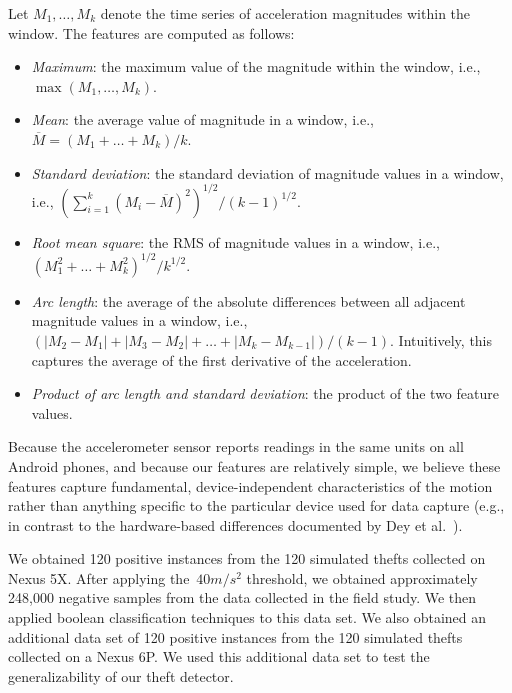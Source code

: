 Let $M_1,\dots,M_k$ denote the time series of acceleration magnitudes within the window.
The features are computed as follows:
\begin{itemize}
\item \emph{Maximum}: the maximum value of the magnitude within the window, i.e., $\max(M_1,\dots,M_k)$.
\item \emph{Mean}: the average value of magnitude in a window, i.e., $\overline{M}=(M_1+\dots + M_k)/k$.
\item \emph{Standard deviation}: the standard deviation of magnitude values in a window, i.e., $(\sum_{i=1}^{k}(M_i-\overline{M})^2)^{1/2}/(k-1)^{1/2}$.
\item \emph{Root mean square}: the RMS of magnitude values in a window, i.e., $(M_1^2 + \dots + M_k^2)^{1/2}/k^{1/2}$.
\item \emph{Arc length}: the average of the absolute differences between all adjacent magnitude values in a window, i.e., $(|M_2-M_1| + |M_3-M_2| + \dots + |M_k-M_{k-1}|)/(k-1)$.
Intuitively, this captures the average of the first derivative of the acceleration.
\item \emph{Product of arc length and standard deviation}: the product of the two feature values.
\end{itemize}

Because the accelerometer sensor reports readings in the same units on all Android phones, and because our features are relatively simple, we believe these features capture fundamental, device-independent characteristics of the motion rather than anything specific to the particular device used for data capture (e.g., in contrast to the hardware-based differences documented by Dey et al.~\cite{Dey2014}).

We obtained 120 positive instances from the 120 simulated thefts collected on Nexus 5X.
After applying the~$40 m/s^2$ threshold, we obtained approximately 248,000 negative samples from the data collected in the field study.
We then applied boolean classification techniques to this data set.
We also obtained an additional data set of 120 positive instances from the 120 simulated thefts collected on a Nexus 6P.
We used this additional data set to test the generalizability of our theft detector.




